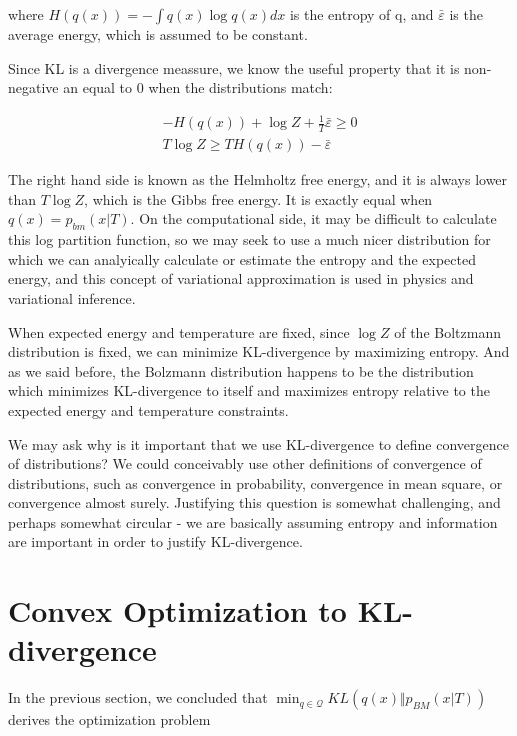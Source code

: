 \documentclass[a4paper]{article}
\begin{document}
where $H\left( q(x) \right) = - \int q(x) \log q(x) dx $ is the entropy of q, and $\bar{\varepsilon}$ is the average energy, which is assumed to be constant.

Since KL is a divergence meassure, we know the useful property that it is non-negative an equal to 0 when the distributions match:

\begin{equation}
  \begin{split}
    -H\left( q(x) \right) + \log Z + \frac{1}{T} \bar{\varepsilon} \geq 0 \\
    T \log Z \geq T H\left( q(x) \right) - \bar{\varepsilon} 
  \end{split}
  \label{Helmholtz}
\end{equation}

The right hand side is known as the Helmholtz free energy, and it is always lower than $T \log Z$, which is the Gibbs free energy.  It is exactly equal when $q(x) = p_{bm}(x \vert T) $.  On the computational side, it may be difficult to calculate this log partition function, so we may seek to use a much nicer distribution for which we can analyically calculate or estimate the entropy and the expected energy, and this concept of variational approximation is used in physics and variational inference.

When expected energy and temperature are fixed, since $\log Z$ of the Boltzmann distribution is fixed, we can minimize KL-divergence by maximizing entropy.  And as we said before, the Bolzmann distribution happens to be the distribution which minimizes KL-divergence to itself and maximizes entropy relative to the expected energy and temperature constraints.

We may ask why is it important that we use KL-divergence to define convergence of distributions?  We could conceivably use other definitions of convergence of distributions, such as convergence in probability, convergence in mean square, or convergence almost surely.
Justifying this question is somewhat challenging, and perhaps somewhat circular - we are basically assuming entropy and information are important in order to justify KL-divergence.

\section{Convex Optimization to KL-divergence}

In the previous section, we concluded that $\min_{q \in \mathcal{Q} } KL\left( q(x) \Vert p_{BM} ( x \vert T) \right)$ derives the optimization problem
\end{document}
